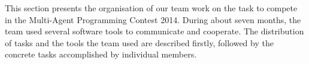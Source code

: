 This section presents the organisation of our team work on the task to compete in the Multi-Agent Programming Contest 2014.
During about seven months, the team used several software tools to communicate and cooperate.
The distribution of tasks and the tools the team used are described firstly, followed by the concrete tasks accomplished by individual members.















